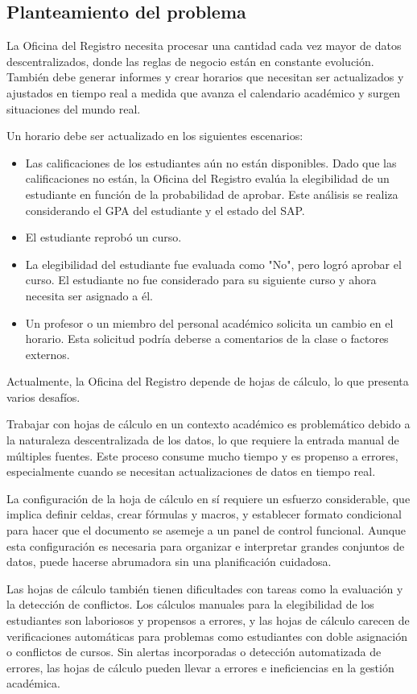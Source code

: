 \subsection{Planteamiento del problema}
La Oficina del Registro necesita procesar una cantidad cada vez mayor de datos descentralizados, donde las reglas de negocio están en constante evolución. También debe generar informes y crear horarios que necesitan ser actualizados y ajustados en tiempo real a medida que avanza el calendario académico y surgen situaciones del mundo real.

Un horario debe ser actualizado en los siguientes escenarios:
\begin{itemize}
    \item Las calificaciones de los estudiantes aún no están disponibles. Dado que las calificaciones no están, la Oficina del Registro evalúa la elegibilidad de un estudiante en función de la probabilidad de aprobar. Este análisis se realiza considerando el GPA del estudiante y el estado del SAP.
    \item El estudiante reprobó un curso.
    \item La elegibilidad del estudiante fue evaluada como "No", pero logró aprobar el curso. El estudiante no fue considerado para su siguiente curso y ahora necesita ser asignado a él.
    \item Un profesor o un miembro del personal académico solicita un cambio en el horario. Esta solicitud podría deberse a comentarios de la clase o factores externos.
\end{itemize}

Actualmente, la Oficina del Registro depende de hojas de cálculo, lo que presenta varios desafíos.

Trabajar con hojas de cálculo en un contexto académico es problemático debido a la naturaleza descentralizada de los datos, lo que requiere la entrada manual de múltiples fuentes. Este proceso consume mucho tiempo y es propenso a errores, especialmente cuando se necesitan actualizaciones de datos en tiempo real.

La configuración de la hoja de cálculo en sí requiere un esfuerzo considerable, que implica definir celdas, crear fórmulas y macros, y establecer formato condicional para hacer que el documento se asemeje a un panel de control funcional. Aunque esta configuración es necesaria para organizar e interpretar grandes conjuntos de datos, puede hacerse abrumadora sin una planificación cuidadosa.

Las hojas de cálculo también tienen dificultades con tareas como la evaluación y la detección de conflictos. Los cálculos manuales para la elegibilidad de los estudiantes son laboriosos y propensos a errores, y las hojas de cálculo carecen de verificaciones automáticas para problemas como estudiantes con doble asignación o conflictos de cursos. Sin alertas incorporadas o detección automatizada de errores, las hojas de cálculo pueden llevar a errores e ineficiencias en la gestión académica.

